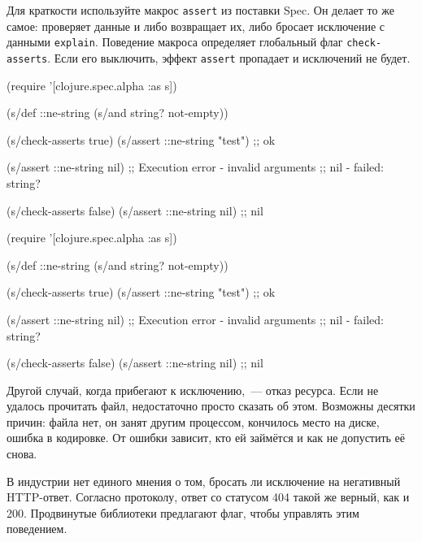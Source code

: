 \fi


Для краткости используйте макрос \verb|assert| из поставки Spec. Он делает то
же самое: проверяет данные и либо возвращает их, либо бросает исключение с
данными \verb|explain|. Поведение макроса определяет глобальный флаг
\verb|check-asserts|. Если его выключить, эффект \verb|assert| пропадает и
исключений не будет.

\ifx\devicetype\mobile

\begin{english}
  \begin{clojure}
(require '[clojure.spec.alpha :as s])

(s/def ::ne-string
  (s/and string? not-empty))

(s/check-asserts true)
(s/assert ::ne-string "test") ;; ok

(s/assert ::ne-string nil)
;; Execution error - invalid arguments
;; nil - failed: string?

(s/check-asserts false)
(s/assert ::ne-string nil) ;; nil
  \end{clojure}
\end{english}

\else

\begin{english}
  \begin{clojure}
(require '[clojure.spec.alpha :as s])

(s/def ::ne-string (s/and string? not-empty))

(s/check-asserts true)
(s/assert ::ne-string "test") ;; ok

(s/assert ::ne-string nil)
;; Execution error - invalid arguments
;; nil - failed: string?

(s/check-asserts false)
(s/assert ::ne-string nil) ;; nil
  \end{clojure}
\end{english}

\fi

Другой случай, когда прибегают к исключению,~--- отказ ресурса. Если не удалось
прочитать файл, недостаточно просто сказать об этом. Возможны десятки причин:
файла нет, он занят другим процессом, кончилось место на диске, ошибка в
кодировке. От ошибки зависит, кто ей займётся и как не допустить её
снова.


В индустрии нет единого мнения о том, бросать ли исключение на негативный
HTTP-ответ. Согласно протоколу, ответ со статусом 404 такой же верный, как и
200. Продвинутые библиотеки предлагают флаг, чтобы управлять этим поведением.

